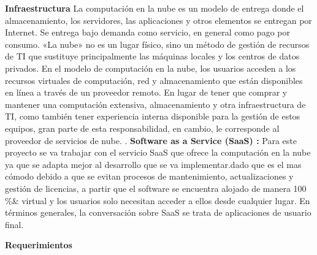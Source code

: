 \textbf{Infraestructura }
\newline
La computación en la nube es un modelo de entrega donde el almacenamiento, los servidores, las aplicaciones y otros elementos se entregan por Internet. Se entrega bajo demanda como servicio, en general como pago por consumo. «La nube» no es un lugar físico, sino un método de gestión de recursos de TI que sustituye principalmente las máquinas locales y los centros de datos privados. En el modelo de computación en la nube, los usuarios acceden a los recursos virtuales de computación, red y almacenamiento que están disponibles en línea a través de un proveedor remoto. En lugar de tener que comprar y mantener una computación extensiva, almacenamiento y otra infraestructura de TI, como también tener experiencia interna disponible para la gestión de estos equipos, gran parte de esta responsabilidad, en cambio, le corresponde al proveedor de servicios de nube. \cite{glosario_2022}.
\newline
\textbf{Software as a Service (SaaS) :}
Para este proyecto se va trabajar con el servicio SaaS que ofrece la computación en la nube ya que se adapta mejor al desarrollo que se va implementar.dado que es el mas cómodo debido a que se evitan procesos de mantenimiento, actualizaciones y gestión de licencias, a partir que el software se encuentra alojado de manera 100 \%& virtual y los usuarios solo necesitan acceder a ellos desde cualquier lugar. En términos generales, la conversación sobre SaaS se trata de aplicaciones de usuario final. \cite{microsoftazure_2022}


\textbf{Requerimientos}

